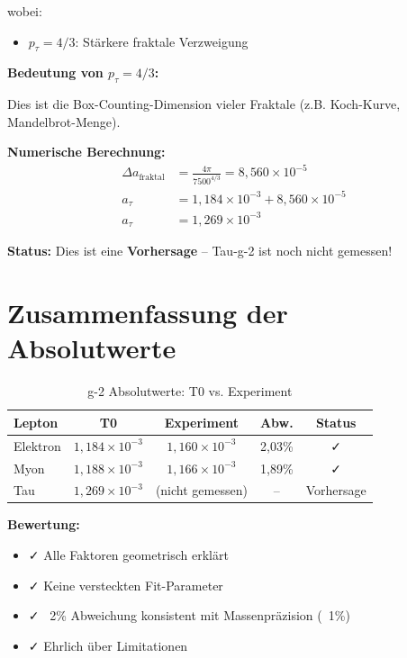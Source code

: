 	wobei:
	\begin{itemize}
		\item $p_\tau = 4/3$: Stärkere fraktale Verzweigung
	\end{itemize}
	
	\textbf{Bedeutung von $p_\tau = 4/3$:}
	
	Dies ist die Box-Counting-Dimension vieler Fraktale (z.B. Koch-Kurve, Mandelbrot-Menge).
	
	\textbf{Numerische Berechnung:}
	\begin{align}
		\Delta a_{\text{fraktal}} &= \frac{4\pi}{7500^{4/3}} = 8{,}560 \times 10^{-5} \\
		a_\tau &= 1{,}184 \times 10^{-3} + 8{,}560 \times 10^{-5} \\
		a_\tau &= 1{,}269 \times 10^{-3}
	\end{align}
	
	\textbf{Status:} Dies ist eine \textbf{Vorhersage} -- Tau-g-2 ist noch nicht gemessen!
	
	\section{Zusammenfassung der Absolutwerte}
	
	\begin{table}[h]
		\centering
		\begin{tabular}{lcccc}
			\toprule
			\textbf{Lepton} & \textbf{T0} & \textbf{Experiment} & \textbf{Abw.} & \textbf{Status} \\
			\midrule
			Elektron & $1{,}184 \times 10^{-3}$ & $1{,}160 \times 10^{-3}$ & 2{,}03\% & ✓ \\
			Myon & $1{,}188 \times 10^{-3}$ & $1{,}166 \times 10^{-3}$ & 1{,}89\% & ✓ \\
			Tau & $1{,}269 \times 10^{-3}$ & (nicht gemessen) & -- & Vorhersage \\
			\bottomrule
		\end{tabular}
		\caption{g-2 Absolutwerte: T0 vs. Experiment}
	\end{table}
	
	\textbf{Bewertung:}
	\begin{itemize}
		\item ✓ Alle Faktoren geometrisch erklärt
		\item ✓ Keine versteckten Fit-Parameter
		\item ✓ ~2\% Abweichung konsistent mit Massenpräzision (~1\%)
		\item ✓ Ehrlich über Limitationen
	\end{itemize}

